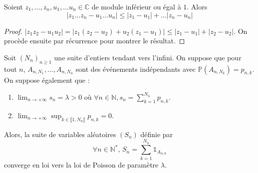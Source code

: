 






  \begin{lemma}
    \label{theoreme-des-evenements-rares-de-poisson-1}
    Soient $z_1, \dots, z_n, u_1, \dots u_n \in \mathbb{C}$ de module inférieur ou égal à $1$. Alors
    \[ |z_1 \dots z_n - u_1 \dots u_n| \leq |z_1-u_1| + \dots |z_n - u_n| \]
  \end{lemma}

  \begin{proof}
    $|z_1 z_2 - u_1 u_2| = |z_1(z_2 - u_2) + u_2(z_1 - u_1)| \leq |z_1 - u_1| + |z_2 - u_2|$. On procède ensuite par récurrence pour montrer le résultat.
  \end{proof}


  \begin{theorem}
    Soit $(N_n)_{n \geq 1}$ une suite d'entiers tendant vers l'infini. On suppose que pour tout $n$, $A_{n,N_1}, \dots , A_{n,N_n}$ sont des événements indépendants avec $\mathbb{P}(A_{n,N_k}) = p_{n,k}$. On suppose également que :
    \begin{enumerate}[label=(\roman*)]
      \item $\lim_{n \rightarrow +\infty} s_n = \lambda > 0$ où $\forall n \in \mathbb{N}, s_n = \sum_{k=1}^{N_n} p_{n,k}$.
      \item $\lim_{n \rightarrow +\infty} \sup_{k \in \llbracket 1, N_n \rrbracket} p_{n,k} = 0$.
    \end{enumerate}
    Alors, la suite de variables aléatoires $(S_n)$ définie par
    \[ \forall n \in \mathbb{N}^*, \, S_n = \sum_{k=1}^{N_n} \mathbb{1}_{A_{n,k}} \]
    converge en loi vers la loi de Poisson de paramètre $\lambda$.
  \end{theorem}

